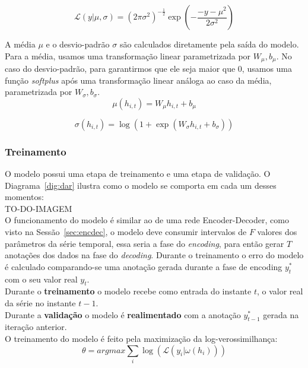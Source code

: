 \[
\mathcal{L}(y | \mu,\sigma) = {(2\pi\sigma^2)}^{-\frac{1}{2}} \exp(-  \frac{-y - \mu^2}{2\sigma^2})  
\]

A média $\mu$ e o desvio-padrão $\sigma$ são calculados diretamente pela saída do modelo. Para a média, usamos uma transformação linear parametrizada por $W_{\mu},b_{\mu}$. No caso do desvio-padrão, para garantirmos que ele seja maior que 0, usamos uma função \textit{softplus} após uma transformação linear análoga ao caso da média, parametrizada por  $W_{\sigma},b_{\sigma}$.\\

\[ \mu(h_{i,t}) = W_{\mu}h_{i,t} + b_{\mu} \]

\[ \sigma(h_{i,t}) = \log(1 + \exp(W_{\sigma}h_{i,t}+ b_{\sigma})) \]


\subsubsection{Treinamento}



O modelo possui uma etapa de treinamento e uma etapa de validação. O Diagrama~\ref{dig:dar} ilustra como o modelo se comporta em cada um desses momentos: \\


TO-DO-IMAGEM \\


O funcionamento do modelo é similar ao de uma rede Encoder-Decoder, como visto na Sessão~\ref{sec:encdec}, o modelo deve consumir intervalos de $F$ valores dos parâmetros da série temporal, essa seria a fase do \textit{encoding}, para então gerar $T$ anotações dos dados na fase do \textit{decoding}. Durante o treinamento o erro do modelo é calculado comparando-se uma anotação gerada durante a fase de encoding $y^{*}_{t}$ com o seu valor real $y_{t}$. \\

Durante o \textbf{treinamento} o modelo recebe como entrada do instante $t$, o valor real da série no instante $t-1$. \\
  
Durante a \textbf{validação} o modelo é \textbf{realimentado} com a anotação $y^{*}_{t-1}$ gerada na iteração anterior. \\ 



O treinamento do modelo é feito pela maximização da log-verossimilhança: \\

\[
\theta = argmax \sum_i{\log(\mathcal{L}(y_i | \omega(h_{i})))}
\]


